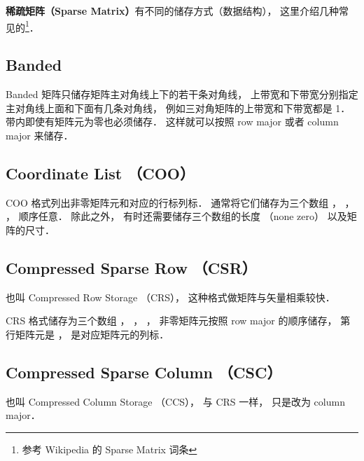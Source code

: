 
\textbf{稀疏矩阵（Sparse Matrix）}有不同的储存方式（数据结构）， 这里介绍几种常见的\footnote{参考 Wikipedia 的 Sparse Matrix 词条}．

\subsection{Banded}
Banded 矩阵只储存矩阵主对角线上下的若干条对角线， 上带宽和下带宽分别指定主对角线上面和下面有几条对角线， 例如三对角矩阵的上带宽和下带宽都是 1． 带内即使有矩阵元为零也必须储存． 这样就可以按照 row major 或者 column major 来储存．

\subsection{Coordinate List （COO）}
COO 格式列出非零矩阵元和对应的行标列标． 通常将它们储存为三个数组 ， ， ， 顺序任意． 除此之外， 有时还需要储存三个数组的长度  （none zero） 以及矩阵的尺寸．

\subsection{Compressed Sparse Row （CSR）}
也叫 Compressed Row Storage （CRS）， 这种格式做矩阵与矢量相乘较快．

CRS 格式储存为三个数组 ， ， ， 非零矩阵元按照 row major 的顺序储存， 第  行矩阵元是 ，  是对应矩阵元的列标．

\subsection{Compressed Sparse Column （CSC）}
也叫 Compressed Column Storage （CCS）， 与 CRS 一样， 只是改为 column major．
